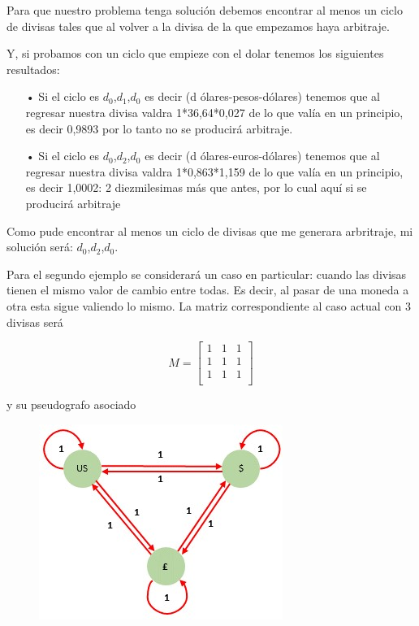 \documentclass[11pt,a4paper]{article}
\begin{document}
Para que nuestro problema tenga soluci\'on debemos encontrar al menos un ciclo de divisas tales que al volver a la divisa de la que empezamos haya arbitraje.

Y, si probamos con un ciclo que empieze con  el dolar tenemos los siguientes resultados:
\begin{itemize}
    \item[•] Si el ciclo es {$d_{0}$,$d_{1}$,$d_{0}$} es decir (d  \'olares-pesos-d\'olares) tenemos que al regresar nuestra divisa valdra 1*36,64*0,027 de lo que val\'ia en un principio, es decir 0,9893 por lo tanto no se producir\'a arbitraje.
    \item[•] Si el ciclo es {$d_{0}$,$d_{2}$,$d_{0}$} es decir (d  \'olares-euros-d\'olares) tenemos que al regresar nuestra divisa valdra 1*0,863*1,159 de lo que val\'ia en un principio, es decir 1,0002: 2 diezmilesimas m\'as que antes, por lo cual aqu\'i si se producir\'a arbitraje
\end{itemize}

Como pude encontrar al menos un ciclo de divisas que me generara arbritraje, mi soluci\'on ser\'a: $d_{0}$,$d_{2}$,$d_{0}$.
\\


Para el segundo ejemplo se considerar\'a un caso en particular: cuando las divisas tienen el mismo valor de cambio entre todas. Es decir, al pasar de una moneda a otra esta sigue valiendo lo mismo. La matriz correspondiente al caso actual con 3 divisas ser\'a

\[
M=
  \begin{bmatrix}
    1 & 1 & 1 \\
    1 & 1 & 1 \\
    1 & 1 & 1 \\
  \end{bmatrix}
\]

y su pseudografo asociado
\begin{figure}[h]
    \centering
    \includegraphics{Grafoejemplo1.jpg}
\end{figure}
\end{document}
